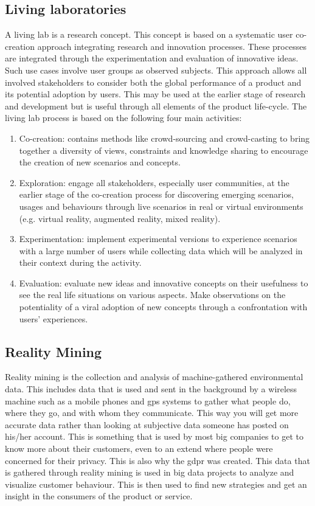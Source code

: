 \documentclass{article}
\begin{document}
\subsection{Living laboratories}
A living lab is a research concept. This concept is based on a systematic user co-creation approach integrating research and innovation processes. These processes are integrated through the experimentation and evaluation of innovative ideas. Such use cases involve user groups as observed subjects. This approach allows all involved stakeholders to consider both the global performance of a product and its potential adoption by users. This may be used at the earlier stage of research and development but is useful through all elements of the product life-cycle. The living lab process is based on the following four main activities:
\begin{enumerate}
    \item Co-creation: contains methods like crowd-sourcing and crowd-casting to bring together a diversity of views, constraints and knowledge sharing to encourage the creation of new scenarios and concepts.
    \item Exploration: engage all stakeholders, especially user communities, at the earlier stage of the co-creation process for discovering emerging scenarios, usages and behaviours through live scenarios in real or virtual environments (e.g. virtual reality, augmented reality, mixed reality).
    \item Experimentation: implement experimental versions to experience scenarios with a large number of users while collecting data which will be analyzed in their context during the activity.
    \item Evaluation: evaluate new ideas and innovative concepts on their usefulness to see the real life situations on various aspects. Make observations on the potentiality of a viral adoption of new concepts through a confrontation with users' experiences.
\end{enumerate}

\subsection{Reality Mining}
Reality mining is the collection and analysis of machine-gathered environmental data. This includes data that is used and sent in the background by a wireless machine such as a mobile phones and \gls{gps} systems to gather what people do, where they go, and with whom they communicate. This way you will get more accurate data rather than looking at subjective data someone has posted on his/her account. This is something that is used by most big companies to get to know more about their customers, even to an extend where people were concerned for their privacy. This is also why the \gls{gdpr} was created. This data that is gathered through reality mining is used in big data projects to analyze and visualize customer behaviour. This is then used to find new strategies and get an insight in the consumers of the product or service.
\end{document}
